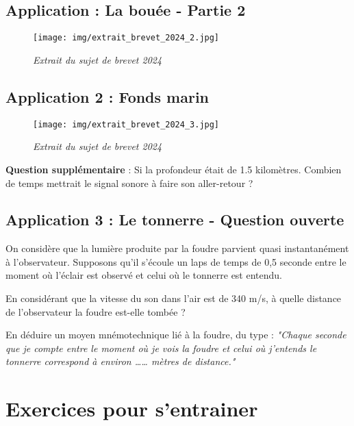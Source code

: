 \documentclass[a4paper,12pt]{article}
\begin{document}
\subsection*{Application : La bouée - Partie 2}

\begin{figure}[H]
  \centering
  \texttt{[image: img/extrait\_brevet\_2024\_2.jpg]}
  \captionsetup{labelformat=empty}
  \caption{\label{} \textit{Extrait du sujet de brevet 2024}}
\end{figure}

\subsection*{Application 2 : Fonds marin}

\begin{figure}[H]
  \centering
  \texttt{[image: img/extrait\_brevet\_2024\_3.jpg]}
  \captionsetup{labelformat=empty}
  \caption{\label{} \textit{Extrait du sujet de brevet 2024}}
\end{figure}

\textbf{Question supplémentaire} : Si la profondeur était de 1.5 kilomètres. Combien de temps mettrait le signal sonore à faire son aller-retour ? 

\subsection*{Application 3 : Le tonnerre - Question ouverte}


On considère que la lumière produite par la foudre parvient quasi instantanément à l'observateur.  
Supposons qu'il s'écoule un laps de temps de 0,5 seconde entre le moment où l'éclair est observé et celui où le tonnerre est entendu.

\vspace{1em}
En considérant que la vitesse du son dans l'air est de 340 m/s, à quelle distance de l'observateur la foudre est-elle tombée ?

\vspace{1em}

En déduire un moyen mnémotechnique lié à la foudre, du type :  
\textit{"Chaque seconde que je compte entre le moment où je vois la foudre et celui où j'entends le tonnerre correspond à environ …… mètres de distance."}


\section*{Exercices pour s'entrainer}
\end{document}
